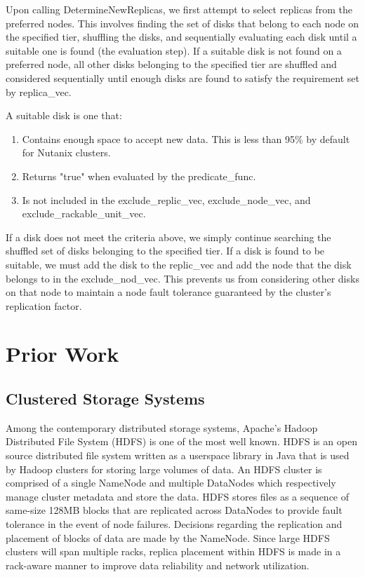 \documentclass[12pt]{article}
\begin{document}
    Upon calling DetermineNewReplicas, we first attempt to select replicas from
    the preferred nodes. This involves finding the set of disks that belong to
    each node on the specified tier, shuffling the disks, and sequentially
    evaluating each disk until a suitable one is found (the evaluation step).
    If a suitable disk is not found on a preferred node, all other disks
    belonging to the specified tier are shuffled and considered sequentially
    until enough disks are found to satisfy the requirement set by replica\_vec.

    A suitable disk is one that:

    \begin{tcolorbox}
    \begin{enumerate}
      \item Contains enough space to accept new data. This is less than 95\% by
            default for Nutanix clusters.  \item Returns "true" when evaluated by the
            predicate\_func.
      \item Is not included in the exclude\_replic\_vec, exclude\_node\_vec,
            and exclude\_rackable\_unit\_vec.
    \end{enumerate}
    \end{tcolorbox}

    If a disk does not meet the criteria above, we simply continue searching
    the shuffled set of disks belonging to the specified tier. If a disk is
    found to be suitable, we must add the disk to the replic\_vec and add the
    node that the disk belongs to in the exclude\_nod\_vec. This prevents us
    from considering other disks on that node to maintain a node fault
    tolerance guaranteed by the cluster's replication factor.

\newpage
\FloatBarrier
\section{Prior Work}

  \subsection{Clustered Storage Systems}

  Among the contemporary distributed storage systems, Apache's Hadoop
  Distributed File System (HDFS) \cite{hadoop} is one of the most well known.
  HDFS is an open source distributed file system written as a userspace library
  in Java that is used by Hadoop clusters for storing large volumes of data. An
  HDFS cluster is comprised of a single NameNode and multiple DataNodes which
  respectively manage cluster metadata and store the data. HDFS stores files as
  a sequence of same-size 128MB blocks that are replicated across DataNodes to
  provide fault tolerance in the event of node failures. Decisions regarding
  the replication and placement of blocks of data are made by the NameNode.
  Since large HDFS clusters will span multiple racks, replica placement within
  HDFS is made in a rack-aware manner to improve data reliability and network
  utilization.
\end{document}
